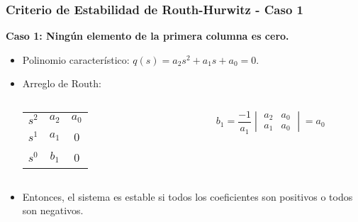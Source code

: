 \documentclass[aspectratio=169,handout]{beamer}
\theoremstyle{definition}
\theoremstyle{plain}
\theoremstyle{remark}
\begin{document}
\begin{frame}[<+->]\frametitle{Criterio de Estabilidad de Routh-Hurwitz - Caso 1}
\textbf{Caso 1: Ningún elemento de la primera columna es cero.}
\begin{itemize}
	\item Polinomio característico: $q(s) = a_2 s^2 + a_1 s + a_0 = 0$.
	\item Arreglo de Routh:\\
	\centering	
	\begin{columns}
	\begin{column}{0.2\textwidth}
	\begin{tabular}{c|cc}
		$s^2$ & $a_2$ & $a_0$\\
		$s^1$ & $a_1$ & 0\\
		$s^0$ & $b_1$ & 0
	\end{tabular}
	\end{column}	
	\begin{column}{0.2\textwidth}
	\begin{equation*}
		b_1 = \frac{-1}{a_1}
		\begin{vmatrix}
			a_2 & a_0\\
			a_1 & a_0
		\end{vmatrix} = a_0
	\end{equation*}
	\end{column}	
	\end{columns}
	\item Entonces, el sistema es estable si todos los coeficientes son positivos o todos son negativos.
\end{itemize}
\end{frame}
\end{document}
